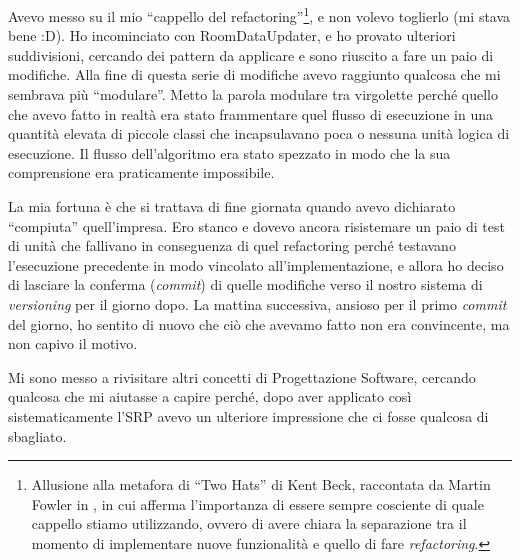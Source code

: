 \documentclass[12pt]{report}
\begin{document}
Avevo messo su il mio ``cappello del refactoring''\footnote{
Allusione alla metafora di ``Two Hats'' di Kent Beck, raccontata
da Martin Fowler in \cite{fowler2002}, in cui afferma l'importanza di
essere sempre cosciente di quale cappello stiamo utilizzando, ovvero 
di avere chiara la separazione tra il momento di implementare nuove 
funzionalità e quello di fare \textit{refactoring}.
}, e non volevo toglierlo (mi stava bene :D). 
Ho incominciato con RoomDataUpdater,
e ho provato ulteriori suddivisioni, cercando dei pattern 
da applicare e sono riuscito a fare un paio di modifiche. Alla fine di questa
serie di modifiche avevo raggiunto qualcosa che mi sembrava più ``modulare''.
Metto la parola modulare tra virgolette perché quello che avevo fatto in realtà
era stato frammentare quel flusso di esecuzione in una quantità elevata di
piccole classi che incapsulavano poca o nessuna unità logica di 
esecuzione. Il flusso dell'algoritmo era stato spezzato in modo che la sua
comprensione era praticamente impossibile.

La mia fortuna è che si trattava di fine giornata quando avevo dichiarato 
``compiuta'' quell'impresa. Ero stanco e dovevo ancora risistemare un paio
di test di unità che fallivano in conseguenza di quel refactoring perché
testavano l'esecuzione precedente in modo vincolato all'implementazione, e
allora ho deciso di lasciare la conferma (\textit{commit}) 
di quelle modifiche verso il nostro sistema di \textit{versioning}
per il giorno dopo.
La mattina successiva, ansioso per il primo \textit{commit} del giorno,
ho sentito di nuovo che ciò che avevamo fatto non era convincente,
ma non capivo il motivo.


Mi sono messo a rivisitare altri concetti di Progettazione 
Software, cercando qualcosa che mi
aiutasse a capire perché, dopo aver applicato così sistematicamente l'SRP
avevo un ulteriore impressione che ci fosse qualcosa di sbagliato.
\end{document}
